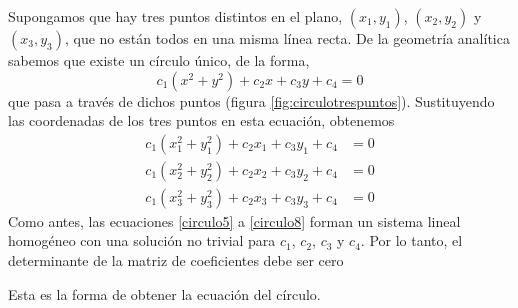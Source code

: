 Supongamos que hay tres puntos distintos en el plano, $(x_1, y_1)$, $(x_2, y_2)$ y $(x_3, y_3)$, que no están todos en una misma línea recta. De la geometría analítica sabemos que existe un círculo único, de la forma,
\begin{equation}
    c_1\left(x^2 + y^2\right) + c_2x + c_3y + c_4 = 0 \label{circulo5}
\end{equation}
que pasa a través de dichos puntos (figura \ref{fig:circulotrespuntos}). Sustituyendo las coordenadas de los
\newpage
{}
\noindent tres puntos en esta ecuación, obtenemos
\begin{align}
    c_1\left(x_1^2 + y_1^2\right) + c_2x_1 + c_3y_1 + c_4 & = 0 \label{circulo6} \\
    c_1\left(x_2^2 + y_2^2\right) + c_2x_2 + c_3y_2 + c_4 & = 0 \label{circulo7} \\
    c_1\left(x_3^2 + y_3^2\right) + c_2x_3 + c_3y_3 + c_4 & = 0 \label{circulo8}
\end{align}
Como antes, las ecuaciones \eqref{circulo5} a \eqref{circulo8} forman un sistema lineal homogéneo con una solución no trivial para $c_1$, $c_2$, $c_3$ y $c_4$. Por lo tanto, el determinante de la matriz de coeficientes debe ser cero
\begin{matriz}
     \label{circulo9}
\end{matriz}
Esta es la forma de obtener la ecuación del círculo.

